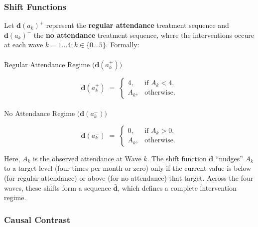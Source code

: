 \documentclass[
  single column]{article}
\makeatletter
\let\oldparagraph\paragraph
\renewcommand{\paragraph}{
    \@ifstar
      \xxxParagraphStar
      \xxxParagraphNoStar
  }
\newcommand{\xxxParagraphStar}[1]{\oldparagraph*{#1}\mbox{}}
\newcommand{\xxxParagraphNoStar}[1]{\oldparagraph{#1}\mbox{}}
\makeatother
\begin{document}
\subsubsection{Shift Functions}\label{shift-functions}

Let \(\boldsymbol{\text{d}}(a_k)^+\) represent the \textbf{regular
attendance} treatment sequence and \(\boldsymbol{\text{d}}(a_k)^-\) the
\textbf{no attendance} treatment sequence, where the interventions
occure at each wave \(k = 1\dots 4; k\in \{0\dots 5\}\). Formally:

\paragraph{\texorpdfstring{Regular Attendance Regime
\(\bigl(\boldsymbol{\text{d}}(a_k^+)\bigr)\)}{Regular Attendance Regime \textbackslash bigl(\textbackslash boldsymbol\{\textbackslash text\{d\}\}(a\_k\^{}+)\textbackslash bigr)}}\label{regular-attendance-regime-biglboldsymboltextda_kbigr}

\[
\boldsymbol{\text{d}} (a_k^+) 
\;=\; 
\begin{cases}
4, & \text{if } A_k < 4,\\[6pt]
A_k, & \text{otherwise.}
\end{cases}
\]

\paragraph{\texorpdfstring{No Attendance Regime
\(\bigl(\boldsymbol{\text{d}}(a_k^-)\bigr)\)}{No Attendance Regime \textbackslash bigl(\textbackslash boldsymbol\{\textbackslash text\{d\}\}(a\_k\^{}-)\textbackslash bigr)}}\label{no-attendance-regime-biglboldsymboltextda_k-bigr}

\[
\boldsymbol{\text{d}}(a_k^-) 
\;=\; 
\begin{cases}
0, & \text{if } A_k > 0,\\[6pt]
A_k, & \text{otherwise.}
\end{cases}
\]

Here, \(A_k\) is the observed attendance at Wave \(k\). The shift
function \(\boldsymbol{\text{d}}\) ``nudges'' \(A_k\) to a target level
(four times per month or zero) only if the current value is below (for
regular attendance) or above (for no attendance) that target. Across the
four waves, these shifts form a sequence
\(\boldsymbol{\bar{\boldsymbol{\text{d}}}}\), which defines a complete
intervention regime.

\subsubsection{Causal Contrast}\label{causal-contrast}
\end{document}
